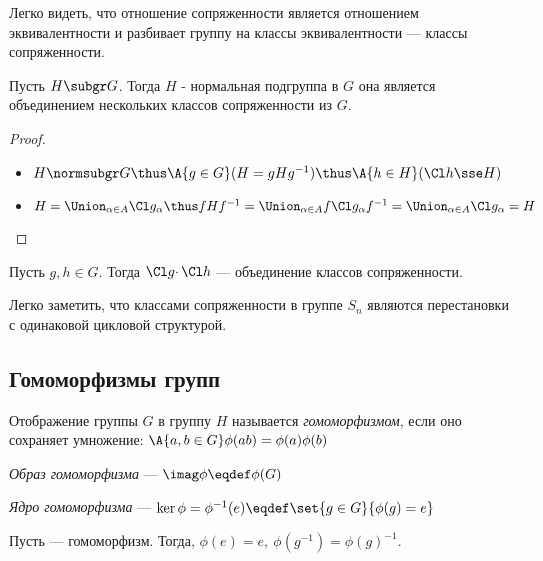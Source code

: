 Легко видеть, что отношение сопряженности является отношением эквивалентности и разбивает группу на классы эквивалентности --- классы сопряженности.

\begin{theorem}
  Пусть $H \subgr G$. Тогда $H$ - нормальная подгруппа в $G$ \iff она является объединением нескольких классов сопряженности из $G$.
\end{theorem}
\begin{proof}
  \theoremlistshack
  \begin{itemize}
    \item[\thus] $H\normsubgr G \thus \A{g \in G}(H=gHg^{-1}) \thus \A{h \in H}(\Cl h\sse H)$
    \item[\because] \sloppy $H=\Union_{\alpha\in A}\Cl g_\alpha \thus fHf^{-1}=\Union_{\alpha\in A}f\Cl g_\alpha f^{-1}=\Union_{\alpha\in A}\Cl g_\alpha=H$
  \end{itemize}
\end{proof}

\begin{theorem}
  Пусть $g, h \in G$. Тогда $\Cl g \cdotp\Cl h$ --- объединение классов сопряженности.
\end{theorem}

\begin{example}
  Легко заметить, что классами сопряженности в группе $S_n$ являются перестановки с одинаковой цикловой структурой.
\end{example}

\subsection{Гомоморфизмы групп}
\begin{definition}
  Отображение  группы $G$ в группу $H$ называется \emph{гомоморфизмом}, если оно сохраняет умножение: $\A{a,b \in G} \phi(ab)=\phi(a)\phi(b)$
\end{definition}

\begin{definition}
  \emph{Образ гомоморфизма} --- $\imag\phi\eqdef\phi(G)$
\end{definition}

\begin{definition}
  \emph{Ядро гомоморфизма} --- $\ker\phi=\phi^{-1}(e)\eqdef\set{g\in G}{\phi(g)=e}$
\end{definition}

\begin{theorem}
  Пусть \phi --- гомоморфизм. Тогда, $\phi(e)=e,\ \phi(g^{-1})=\phi(g)^{-1}$.
\end{theorem}

